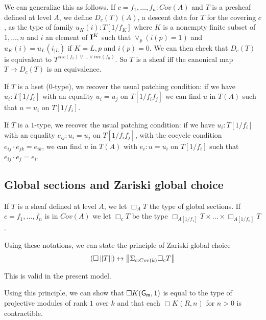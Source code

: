 We can generalize this as follows. If $c = f_1,\dots,f_n:Cov(A)$  and $T$ is a presheaf defined at level $A$, we define
$D_c(T)(A)$, a descent data for $T$ for the covering $c$, as the type of family $u_K(i):T[1/f_K]$ where $K$ is a nonempty
finite subset of $1,\dots,n$ and $i$ an element of $\mathbf{I}^K$ such that $\vee_p (i(p) = 1)$ and $u_K(i) = u_L(i_{|L})$
if $K = L,p$ and $i(p) = 0$. We can then check that $D_c(T)$ is equivalent to $T^{inv(f_1)\vee\dots\vee inv(f_n)}$.
So $T$ is a sheaf iff the canonical map $T\rightarrow D_c(T)$ is an equivalence.

\medskip

If $T$ is a hset ($0$-type), we recover the usual patching condition: if we have $u_i:T[1/f_i]$ with an equality $u_i = u_j$ on
$T[1/f_if_j]$ we can find $u$ in $T(A)$ such that $u = u_i$ on $T[1/f_i]$.

If $T$ is a $1$-type, we recover the usual patching condition: if we have $u_i:T[1/f_i]$ with an equality $e_{ij}:u_i = u_j$ on
$T[1/f_if_j]$, with the cocycle condition $e_{ij}\cdot e_{jk} = e_{ik}$,
we can find $u$ in $T(A)$ with $e_i:u = u_i$ on $T[1/f_i]$ such that $e_{ij}\cdot e_j = e_i$.





\subsection{Global sections and Zariski global choice}

If $T$ is a sheaf defined at level $A$, we let $\Box_A T$ the type of global sections.
If $c = f_1,\dots,f_n$ is in $Cov(A)$ we let $\Box_c T$ be the type $\Box_{A[1/f_1]}T\times\dots\times\Box_{A[1/f_n]}T$.

Using these notations, we can state the principle of Zariski global choice
$$
(\Box \left\lVert T \right\rVert)\leftrightarrow \left\lVert \Sigma_{c:Cov(k)}\Box_c T \right\rVert
$$

This is valid in the present model.

Using this principle, we can show that $\Box K(\mathsf{G_m},1)$ is equal to the type of projective modules of rank $1$ over $k$
and that each $\Box K(R,n)$ for $n>0$ is contractible.
                                                                                  




 
